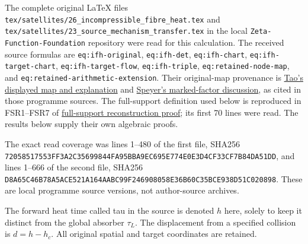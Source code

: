 \documentclass[
  10pt,
  a4paper,
]{article}
\begin{document}
The complete original LaTeX files
\texttt{tex/\allowbreak{}satellites/\allowbreak{}26\_\allowbreak{}incompressible\_\allowbreak{}fibre\_\allowbreak{}heat.\allowbreak{}tex} and
\texttt{tex/\allowbreak{}satellites/\allowbreak{}23\_\allowbreak{}source\_\allowbreak{}mechanism\_\allowbreak{}transfer.\allowbreak{}tex} in the local
\texttt{Zeta-\allowbreak{}Function-\allowbreak{}Foundation} repository were read for this
calculation. The received source formulas are \texttt{eq:\allowbreak{}ifh-\allowbreak{}original},
\texttt{eq:\allowbreak{}ifh-\allowbreak{}det}, \texttt{eq:\allowbreak{}ifh-\allowbreak{}chart},
\texttt{eq:\allowbreak{}ifh-\allowbreak{}target-\allowbreak{}chart}, \texttt{eq:\allowbreak{}ifh-\allowbreak{}target-\allowbreak{}flow},
\texttt{eq:\allowbreak{}ifh-\allowbreak{}triple}, \texttt{eq:\allowbreak{}retained-\allowbreak{}node-\allowbreak{}map}, and
\texttt{eq:\allowbreak{}retained-\allowbreak{}arithmetic-\allowbreak{}extension}. Their original-map provenance
is
\href{https://terrytao.wordpress.com/2026/07/21/a-digestion-of-the-jacobian-conjecture-counterexample/}{Tao's
displayed map and explanation} and
\href{https://sbseminar.wordpress.com/2026/07/20/the-new-counterexample-to-the-jacobian-conjecture/}{Speyer's
marked-factor discussion}, as cited in those programme sources. The
full-support definition used below is reproduced in FSR1--FSR7 of
\href{https://github.com/KokunoYumeto/zeta-function-research-reader/blob/173dbc6ed5a03235dbe7654f928f3692107db39b/workbenches/splitzero-tandem/branches/tau-zero-prime-positivity/FULL_SUPPORT_RECONSTRUCTION_DERIVATION.md}{full-support
reconstruction proof}; its first 70 lines were read. The results below
supply their own algebraic proofs.

The exact read coverage was lines 1--480 of the first file, SHA256
\texttt{72058517\allowbreak{}553FF3A2\allowbreak{}C3569984\allowbreak{}4FA95BBA\allowbreak{}9EC695E7\allowbreak{}74E0E3D4\allowbreak{}CF33CF7B\allowbreak{}84DA51DD},
and lines 1--666 of the second file, SHA256
\texttt{D8A65C46\allowbreak{}B78A5ACE\allowbreak{}521A164A\allowbreak{}ABC99F24\allowbreak{}6908058E\allowbreak{}36B60C35\allowbreak{}BCE938D5\allowbreak{}1C020898}.
These are local programme source versions, not author-source archives.

The forward heat time called tau in the source is denoted \(h\) here,
solely to keep it distinct from the global absorber \(\tau_L\). The
displacement from a specified collision is \(d=h-h_c\). All original
spatial and target coordinates are retained.
\end{document}

